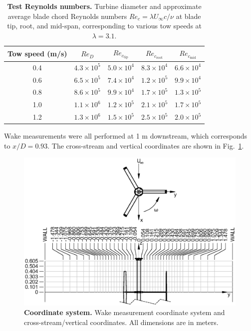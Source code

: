 \documentclass[10pt,letterpaper]{article}
\begin{document}
\begin{table}[ht]
\centering
\begin{tabular}{c|c|c|c|c}
Tow speed (m/s) & $Re_D$ & $Re_{c_\mathrm{tip}}$ & $Re_{c_\mathrm{root}}$ & $Re_{c_\mathrm{mid}}$\\ 
\hline 
0.4 & $4.3 \times 10^5$ & $5.0 \times 10^4$ & $8.3 \times 10^4$ & $6.6 \times 10^4$ \\ 
0.6 & $6.5 \times 10^5$ & $7.4 \times 10^4$ & $1.2 \times 10^5$ & $9.9 \times 10^4$ \\ 
0.8 & $8.6 \times 10^5$ & $9.9 \times 10^4$ & $1.7 \times 10^5$ & $1.3 \times 10^5$ \\ 
1.0 & $1.1 \times 10^6$ & $1.2 \times 10^5$ & $2.1 \times 10^5$ & $1.7 \times 10^5$ \\ 
1.2 & $1.3 \times 10^6$ & $1.5 \times 10^5$ & $2.5 \times 10^5$ & $2.0 \times 10^5$ \\ 
\end{tabular} 

\caption{{\bf Test Reynolds numbers.} Turbine diameter and approximate average
    blade chord Reynolds numbers $Re_c=\lambda U_\infty c / \nu$ at blade tip, root,
    and mid-span, corresponding to various tow speeds at $\lambda=3.1$.}

\label{tab:re}
\end{table}


Wake measurements were all performed at 1 m downstream, which corresponds to
$x/D = 0.93$. The cross-stream and vertical coordinates are shown in
Fig.~\ref{fig:coordinates}.

\begin{figure}[h]
\includegraphics[width=\textwidth]{figures/turbine_coordinate_system}
\caption{{\bf Coordinate system.} Wake measurement coordinate system and 
cross-stream/vertical coordinates. All dimensions are in meters.} 
\label{fig:coordinates}
\end{figure}
\end{document}
